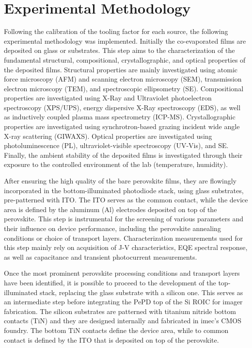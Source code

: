 \section{Experimental Methodology}

Following the calibration of the tooling factor for each source, the following experimental methodology was implemented. Initially the co-evaporated  films are deposited on glass or  substrates. This step aims to the characterization of the fundamental structural, compositional, crystallographic, and optical properties of the deposited films. Structural properties are mainly investigated using atomic force microscopy (AFM) and scanning electron microscopy (SEM), transmission electron microscopy (TEM), and spectroscopic ellipsometry (SE). Compositional properties are investigated using X-Ray and Ultraviolet photoelectron spectroscopy (XPS/UPS), energy dispersive X-Ray spectroscopy (EDS), as well as inductively coupled plasma mass spectrometry (ICP-MS). Crystallographic properties are investigated using synchrotron-based grazing incident wide angle X-ray scattering (GIWAXS). Optical properties are investigated using photoluminescence (PL), ultraviolet-visible spectroscopy (UV-Vis), and SE. Finally, the ambient stability of the deposited films is investigated through their exposure to the controlled environment of the lab (temperature, humidity). 


After ensuring the high quality of the bare perovskite films, they are flowingly incorporated in the bottom-illuminated photodiode stack, using glass substrates, pre-patterned with ITO. The ITO serves as the common contact, while the device area is defined by the aluminum (Al) electrodes deposited on top of the perovskite. This step is instrumental for the screening of various parameters and their influence on device performance, including the perovskite annealing conditions or choice of transport layers. Characterization measurements used for this step mainly rely on acquisition of J-V characteristics, EQE spectral response, as well as capacitance and transient photocurrent measurements.

Once the most prominent perovskite processing conditions and transport layers have been identified, it is possible to proceed to the development of the top-illuminated stack, replacing the glass substrate with a silicon one. This serves as an intermediate step before integrating the PePD top of the Si ROIC for imager fabrication. The silicon substrates are patterned with titanium nitride bottom contacts (TiN) and they are designed internally and fabricated in imec's CMOS foundry. The bottom TiN contacts define the device area, while to common contact is defined by the ITO that is deposited on top of the perovskite.  

